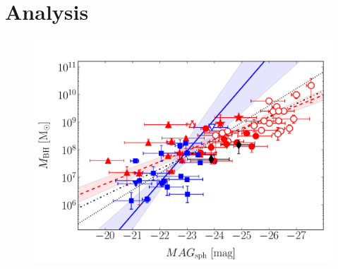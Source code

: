 \documentclass[preprint2]{emulateapj}
\begin{document}
 







\section{Analysis}
\label{sec:anal}
\begin{figure}[h]
\begin{center}
\includegraphics[width=\columnwidth]{images/mbh_vs_mag_sph.pdf}
\caption{}
\label{fig:}
\end{center}
\end{figure}
\end{document}
